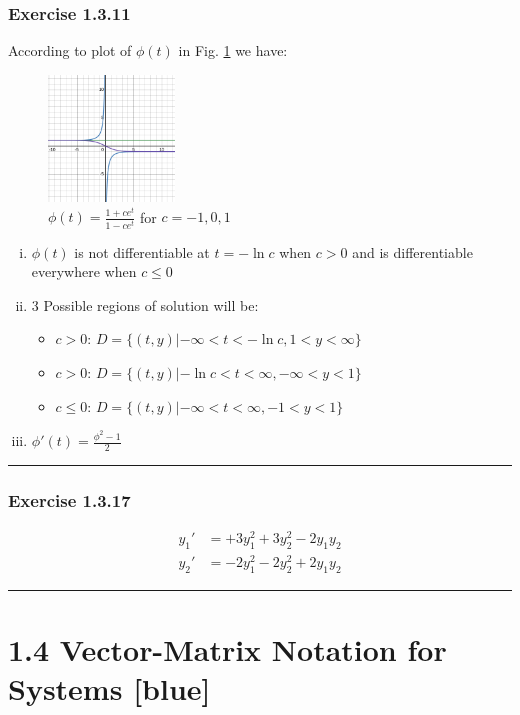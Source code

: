 \documentclass[12pt, letterpaper]{scrartcl}
\begin{document}
\subsubsection*{Exercise 1.3.11}
According to plot of $\phi(t)$ in Fig. \ref{fig:1.3.11} we have:
\begin{figure}[h!]
    \centering
    \includegraphics[width=0.3\textwidth]{fig/1.3.11.png}
    \caption{$\phi(t)=\frac{1+ce^t}{1-ce^{t}}$ for $c=-1, 0, 1$}
    \label{fig:1.3.11}
\end{figure}
\begin{enumerate}[i.]
        \item $\phi(t)$ is not differentiable at $t=-\ln{c}$ when $c>0$ and is differentiable everywhere when $c\leq0$
        \item 3 Possible regions of solution will be:
        \begin{itemize}
            \item $c>0$: $D=\{(t,y)|-\infty<t<-\ln{c},1<y<\infty\}$
            \item $c>0$: $D=\{(t,y)|-\ln{c}<t<\infty,-\infty<y<1\}$
            \item $c\leq0$: $D=\{(t,y)|-\infty<t<\infty,-1<y<1\}$
        \end{itemize}
        \item $\phi'(t)=\frac{\phi^2-1}{2}$
    \end{enumerate}
\vskip1mm\hrule

\subsubsection*{Exercise 1.3.17}

\begin{align*}
    y_1'&=+3y_1^2+3y_2^2-2y_1y_2\\
    y_2'&=-2y_1^2-2y_2^2+2y_1y_2
\end{align*}
\vskip1mm\hrule
\clearpage

\section*{1.4 Vector-Matrix Notation for Systems \xrfill[2pt]{3pt}[blue]}
\end{document}
